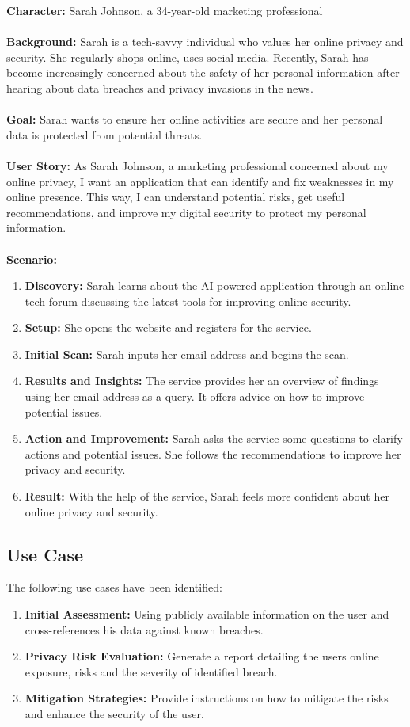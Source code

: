 \documentclass[
    a4paper,
    pagesize,
	pdftex,
    12pt,
]{scrartcl}
\begin{document}
\textbf{Character:} Sarah Johnson, a 34-year-old marketing professional
\\ \\
\textbf{Background:} Sarah is a tech-savvy individual who values her online privacy and security. She regularly shops online, uses social media. Recently, Sarah has become increasingly concerned about the safety of her personal information after hearing about data breaches and privacy invasions in the news.
\\ \\
\textbf{Goal:} Sarah wants to ensure her online activities are secure and her personal data is protected from potential threats.
\\ \\
\textbf{User Story:} As Sarah Johnson, a marketing professional concerned about my online privacy, I want an application that can identify and fix weaknesses in my online presence. This way, I can understand potential risks, get useful recommendations, and improve my digital security to protect my personal information.
\\ \\
\textbf{Scenario:}
\begin{enumerate}
	\item \textbf{Discovery:} Sarah learns about the AI-powered application through an online tech forum discussing the latest tools for improving online security.
	\item \textbf{Setup:} She opens the website and registers for the service.
	\item \textbf{Initial Scan:} Sarah inputs her email address and begins the scan.
	\item \textbf{Results and Insights:} The service provides her an overview of findings using her email address as a query. It offers advice on how to improve potential issues.
	\item \textbf{Action and Improvement:} Sarah asks the service some questions to clarify actions and potential issues. She follows the recommendations to improve her privacy and security.
	\item \textbf{Result:} With the help of the service, Sarah feels more confident about her online privacy and security.
\end{enumerate}

\subsection{Use Case}
The following use cases have been identified:
\begin{enumerate}
	\item \textbf{Initial Assessment:} Using publicly available information on the user and cross-references his data against known breaches.
	\item \textbf{Privacy Risk Evaluation:} Generate a report detailing the users online exposure, risks and the severity of identified breach.
	\item \textbf{Mitigation Strategies:} Provide instructions on how to mitigate the risks and enhance the security of the user. 
\end{enumerate}
\end{document}
